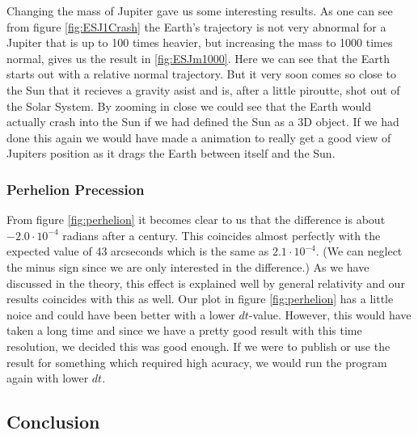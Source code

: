 \documentclass{article}
\newcommand{\E}[1]{\cdot 10^{#1}}
\begin{document}
Changing the mass of Jupiter gave us some interesting results. As one can see from figure \ref{fig:ESJ1Crash} the Earth's trajectory is not very abnormal for a Jupiter that is up to 100 times heavier, but increasing the mass to 1000 times normal, gives us the result in \ref{fig:ESJm1000}. Here we can see that the Earth starts out with a relative normal trajectory. But it very soon comes so close to the Sun that it recieves a gravity asist and is, after a little piroutte, shot out of the Solar System. By zooming in close we could see that the Earth would actually crash into the Sun if we had defined the Sun as a 3D object. If we had done this again we would  have made a animation to really get a good view of Jupiters position as it drags the Earth between itself and the Sun.
\subsubsection*{Perhelion Precession}
From figure \ref{fig:perhelion} it becomes clear to us that the difference is about $-2.0\E{-4}$ radians after a century. This coincides almost perfectly with the expected value of 43 arcseconds which is the same as $2.1\E{-4}$. (We can neglect the minus sign since we are only interested in the difference.) As we have discussed in the theory, this effect is explained well by general relativity and our results coincides with this as well. Our plot in figure \ref{fig:perhelion} has a little noice and could have been better with a lower $dt$-value. However, this would have taken a long time and since we have a pretty good result with this time resolution, we decided this was good enough. If we were to publish or use the result for something which required high acuracy, we would run the program again with lower $dt$.
\subsection{Conclusion}
\end{document}
